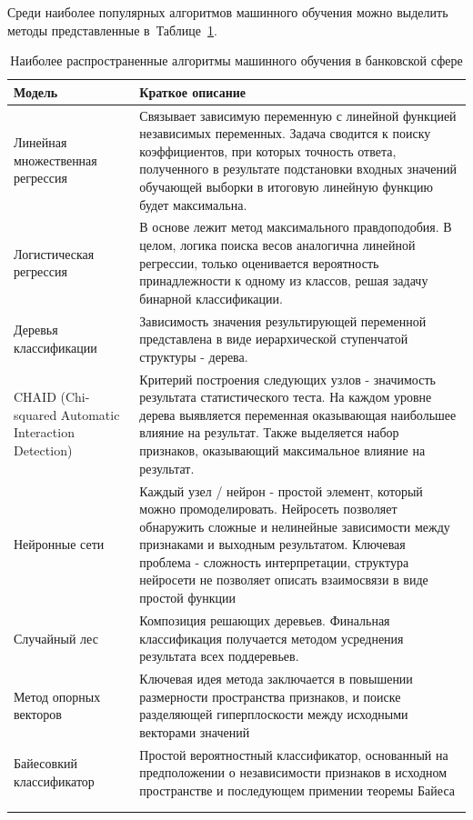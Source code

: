 \documentclass[12pt,a4paper]{article} %
\begin{document}
Среди наиболее популярных алгоритмов машинного обучения можно выделить методы представленные в~Таблице~\ref{Tab:1}.

\begin{center}
	\begin{longtable}{p{5cm}|p{10cm}}
		\hline Модель & Краткое описание    \\
		\endhead
		\hline Линейная множественная регрессия & Связывает зависимую переменную с линейной функцией независимых переменных. Задача сводится к поиску коэффициентов, при которых точность ответа, полученного в результате подстановки входных значений обучающей выборки в итоговую линейную функцию будет максимальна.  
		 \\
		 \hline
		Логистическая регрессия & В основе лежит метод максимального правдоподобия. В целом, логика поиска весов аналогична  линейной регрессии, только оценивается вероятность принадлежности к одному из классов, решая задачу бинарной классификации.
		  \\
		  \hline
		Деревья классификации 
		 & Зависимость значения результирующей переменной представлена в виде иерархической ступенчатой структуры - дерева. 
		  \\
		  \hline
		 CHAID (Chi-squared Automatic Interaction Detection)& Критерий построения следующих узлов - значимость результата статистического теста. На каждом уровне дерева выявляется переменная оказывающая наибольшее влияние на результат. Также выделяется набор признаков, оказывающий максимальное влияние на результат.
		    \\
		\hline
		Нейронные сети&   
		 Каждый узел / нейрон - простой элемент, который можно промоделировать. Нейросеть позволяет обнаружить сложные и нелинейные зависимости между признаками и выходным результатом. Ключевая проблема - сложность интерпретации, структура нейросети не позволяет описать взаимосвязи в виде простой функции \\
		 \hline
		Случайный лес&
		Композиция решающих деревьев. Финальная классификация получается методом усреднения результата всех поддеревьев.
		\\
		\hline
		Метод опорных векторов&
		Ключевая идея метода заключается в повышении размерности пространства признаков, и поиске разделяющей гиперплоскости между исходными векторами значений
		\\
		\hline
		
		Байесовкий классификатор&Простой вероятностный классификатор, основанный на предположении о независимости признаков в исходном пространстве и последующем примении теоремы Байеса\\
		\\
		\hline 
		\caption{Наиболее распространенные алгоритмы машинного обучения в банковской сфере}
		\label{Tab:1}\\
	\end{longtable}

\end{center}
\end{document}

